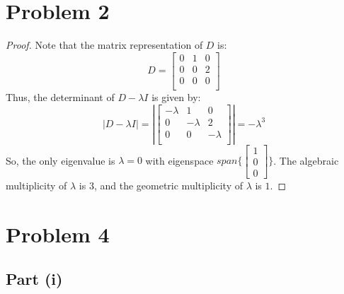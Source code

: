 \documentclass{article}
\begin{document}
\section*{Problem 2}

\begin{proof}
Note that the matrix representation of $D$ is:
$$D = \begin{bmatrix}
0 & 1 & 0 \\
0 & 0 & 2 \\
0 & 0 & 0 \\
\end{bmatrix}$$
Thus, the determinant of $D - \lambda I$ is given by:
$$\lvert D - \lambda I \rvert = \left\lvert \begin{bmatrix}
- \lambda & 1 & 0 \\
0 & - \lambda & 2 \\
0 & 0 & - \lambda \\
\end{bmatrix} \right\rvert = - \lambda^3$$
So, the only eigenvalue is $\lambda = 0$ with eigenspace $span\{\begin{bmatrix}1 \\ 0 \\ 0 \end{bmatrix}\}$. 
The algebraic multiplicity of $\lambda$ is $3$, and the geometric multiplicity of $\lambda$ is $1$.
\end{proof}


\section*{Problem 4}

\subsection*{Part (i)}
\end{document}
